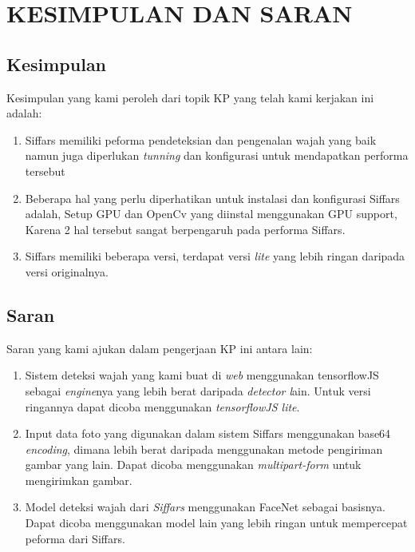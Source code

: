 \chapter{KESIMPULAN DAN SARAN}


\section{Kesimpulan}

Kesimpulan yang kami peroleh dari topik KP yang telah kami kerjakan ini adalah:

\begin{enumerate}[nolistsep]

  \item Siffars memiliki peforma pendeteksian dan pengenalan wajah yang baik namun juga diperlukan \textit{tunning} dan konfigurasi untuk mendapatkan performa tersebut

  \item Beberapa hal yang perlu diperhatikan untuk instalasi dan konfigurasi Siffars adalah, Setup GPU dan OpenCv yang diinstal menggunakan GPU support, Karena 2 hal tersebut sangat berpengaruh pada performa Siffars.

  \item Siffars memiliki beberapa versi, terdapat versi \textit{lite} yang lebih ringan daripada versi originalnya.

\end{enumerate}

\section{Saran}

Saran yang kami ajukan dalam pengerjaan KP ini antara lain:

\begin{enumerate}[nolistsep]

  \item Sistem deteksi wajah yang kami buat di \textit{web} menggunakan tensorflowJS sebagai \textit{engine}nya yang lebih berat daripada \textit{detector l}ain. Untuk versi ringannya dapat dicoba menggunakan \textit{tensorflowJS lite}.

  \item Input data foto yang digunakan dalam sistem Siffars menggunakan base64 \textit{encoding}, dimana lebih berat daripada menggunakan metode pengiriman gambar yang lain. Dapat dicoba menggunakan \textit{multipart-form} untuk mengirimkan gambar.

  \item Model deteksi wajah dari \textit{Siffars} menggunakan FaceNet sebagai basisnya. Dapat dicoba menggunakan model lain yang lebih ringan untuk mempercepat peforma dari Siffars.

\end{enumerate}
